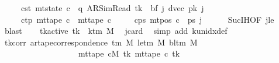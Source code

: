 \begin{isabellebody}
\ \ \ \ \ c{\isacharunderscore}{\kern0pt}st{\isacharcolon}{\kern0pt}\ {\isachardoublequoteopen}mt{\isacharunderscore}{\kern0pt}state\ c\ {\isacharequal}{\kern0pt}\ {\isacharparenleft}{\kern0pt}q{\isacharcomma}{\kern0pt}\ AR{\isacharunderscore}{\kern0pt}SimRead{\isacharcomma}{\kern0pt}\ {\isacharquery}{\kern0pt}tk{\isacharcomma}{\kern0pt}\ {}{\isacharcomma}{\kern0pt}\ {\isacharquery}{\kern0pt}bf\ j{\isacharcomma}{\kern0pt}\ dvec{\isacharcomma}{\kern0pt}\ {\isacharquery}{\kern0pt}pk\ j{\isacharparenright}{\kern0pt}{\isachardoublequoteclose}\isanewline
\ \ \ \ \ c{\isacharunderscore}{\kern0pt}tp{\isacharcolon}{\kern0pt}\ {\isachardoublequoteopen}mt{\isacharunderscore}{\kern0pt}tape\ c\ {\isacharequal}{\kern0pt}\ mt{\isacharunderscore}{\kern0pt}tape\ c{}{\isachardoublequoteclose}\isanewline
\ \ \ \ \ c{\isacharunderscore}{\kern0pt}ps{\isacharcolon}{\kern0pt}\ {\isachardoublequoteopen}mt{\isacharunderscore}{\kern0pt}pos\ c\ {\isacharequal}{\kern0pt}\ {\isacharquery}{\kern0pt}ps\ j{\isachardoublequoteclose}\isanewline
\ \ \ \ \isamarkupfalse%
\ Suc{\isachardot}{\kern0pt}IH{\isacharbrackleft}{\kern0pt}OF\ jle{\isacharbrackright}{\kern0pt}\ \isamarkupfalse%
\ blast\isanewline
\ \ \isamarkupfalse%
\ tk{\isacharunderscore}{\kern0pt}active{\isacharcolon}{\kern0pt}\ {\isachardoublequoteopen}{\isacharquery}{\kern0pt}tk\ {\isacharless}{\kern0pt}\ k{\isacharunderscore}{\kern0pt}tm\ M{\isachardoublequoteclose}\ \isamarkupfalse%
\ jcard\ \isamarkupfalse%
\ {\isacharparenleft}{\kern0pt}simp\ add{\isacharcolon}{\kern0pt}\ k{\isacharunderscore}{\kern0pt}unidx{\isacharunderscore}{\kern0pt}def{\isacharparenright}{\kern0pt}\isanewline
\ \ \isamarkupfalse%
\ tk{\isacharunderscore}{\kern0pt}corr{\isacharcolon}{\kern0pt}\ {\isachardoublequoteopen}ar{\isacharunderscore}{\kern0pt}tape{\isacharunderscore}{\kern0pt}correspondence\ {\isacharparenleft}{\kern0pt}{\isasymGamma}{\isacharunderscore}{\kern0pt}tm\ M{\isacharparenright}{\kern0pt}\ {\isacharparenleft}{\kern0pt}le{\isacharunderscore}{\kern0pt}tm\ M{\isacharparenright}{\kern0pt}\ {\isacharparenleft}{\kern0pt}bl{\isacharunderscore}{\kern0pt}tm\ M{\isacharparenright}{\kern0pt}\isanewline
\ \ \ \ \ \ \ \ \ \ \ \ \ \ \ \ \ \ \ {\isacharparenleft}{\kern0pt}mt{\isacharunderscore}{\kern0pt}tape\ cM\ {\isacharquery}{\kern0pt}tk{\isacharparenright}{\kern0pt}\ {\isacharparenleft}{\kern0pt}mt{\isacharunderscore}{\kern0pt}tape\ c\ {\isacharquery}{\kern0pt}tk{\isacharparenright}{\kern0pt}{\isachardoublequoteclose}\isanewline

\end{isabellebody}

